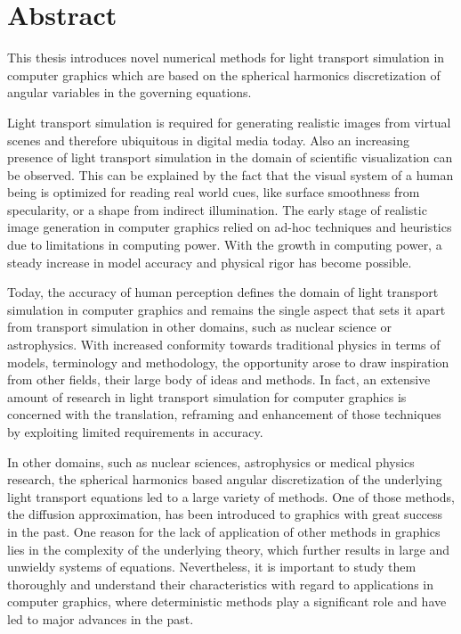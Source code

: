 \chapter*{Abstract}
%
%
This thesis introduces novel numerical methods for light transport simulation in computer graphics which are based on the spherical harmonics discretization of angular variables in the governing equations.

Light transport simulation is required for generating realistic images from virtual scenes and therefore ubiquitous in digital media today. Also an increasing presence of light transport simulation in the domain of scientific visualization can be observed. This can be explained by the fact that the visual system of a human being is optimized for reading real world cues, like surface smoothness from specularity, or a shape from indirect illumination. The early stage of realistic image generation in computer graphics relied on ad-hoc techniques and heuristics due to limitations in computing power. With the growth in computing power, a steady increase in model accuracy and physical rigor has become possible.

Today, the accuracy of human perception defines the domain of light transport simulation in computer graphics and remains the single aspect that sets it apart from transport simulation in other domains, such as nuclear science or astrophysics. With increased conformity towards traditional physics in terms of models, terminology and methodology, the opportunity arose to draw inspiration from other fields, their large body of ideas and methods. In fact, an extensive amount of research in light transport simulation for computer graphics is concerned with the translation, reframing and enhancement of those techniques by exploiting limited requirements in accuracy.

In other domains, such as nuclear sciences, astrophysics or medical physics research, the spherical harmonics based angular discretization of the underlying light transport equations led to a large variety of methods. One of those methods, the diffusion approximation, has been introduced to graphics with great success in the past. One reason for the lack of application of other methods in graphics lies in the complexity of the underlying theory, which further results in large and unwieldy systems of equations. Nevertheless, it is important to study them thoroughly and understand their characteristics with regard to applications in computer graphics, where deterministic methods play a significant role and have led to major advances in the past.

